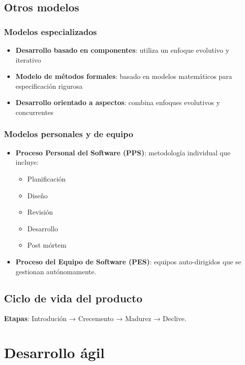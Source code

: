\documentclass[a4paper,11pt]{report}
\begin{document}
\subsection{Otros modelos}

\subsubsection{Modelos especializados}

\begin{itemize}
    \item \textbf{Desarrollo basado en componentes}: utiliza un enfoque evolutivo y iterativo
    \item \textbf{Modelo de métodos formales}: basado en modelos matemáticos para especificación rigurosa
    \item \textbf{Desarrollo orientado a aspectos}: combina enfoques evolutivos y concurrentes
\end{itemize}

\subsubsection{Modelos personales y de equipo}

\begin{itemize}
    \item \textbf{Proceso Personal del Software (PPS)}: metodología individual que incluye:
    \begin{itemize}
        \item Planificación
        \item Diseño
        \item Revisión
        \item Desarrollo
        \item Post mórtem
    \end{itemize}
    \item \textbf{Proceso del Equipo de Software (PES)}: equipos auto-dirigidos que se gestionan autónomamente.
\end{itemize}


\subsection{Ciclo de vida del producto}

\textbf{Etapas}: Introdución → Crecemento → Madurez → Declive.

 \section{Desarrollo ágil}
\end{document}
